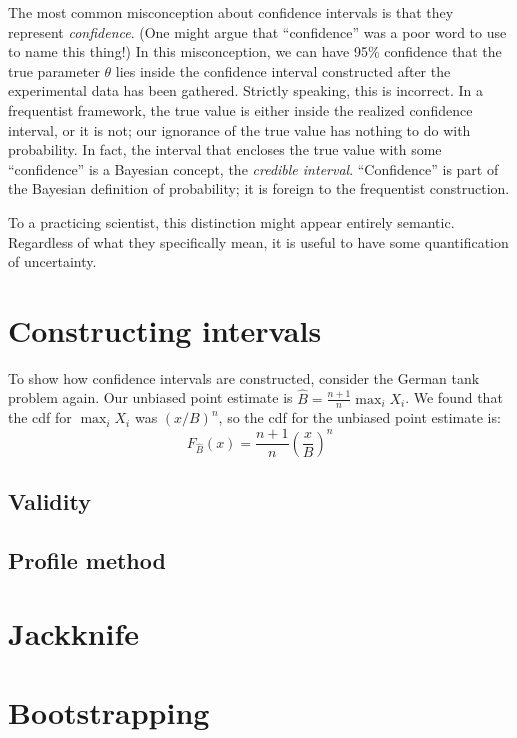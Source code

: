 The most common misconception about confidence intervals is that they represent
\emph{confidence}. (One might argue that ``confidence'' was a poor word to use to name this
thing!) In this misconception, we can have 95\% confidence that the true parameter $\theta$
lies inside the confidence interval constructed after the experimental data has been gathered.
Strictly speaking, this is incorrect. In a frequentist framework, the true
value is either inside the realized confidence interval, or it is not; our ignorance of
the true value has nothing to do with probability. In fact, the interval that encloses
the true value with some ``confidence'' is a Bayesian concept, the \emph{credible interval}.
``Confidence'' is part of the Bayesian definition of probability; it is foreign to the
frequentist construction.

To a practicing scientist, this distinction might appear entirely semantic. Regardless of
what they specifically mean, it is useful to have some quantification of uncertainty.

\section{Constructing intervals}

To show how confidence intervals are constructed, consider the German
tank problem again. Our unbiased point estimate is $\hat{B} = \tfrac{n+1}{n} \max_i X_i$.
We found that the cdf for $\max_i X_i$ was $(x/B)^n$, so the cdf for the
unbiased point estimate is:
\begin{equation*}
    F_{\hat{B}}(x) = \frac{n+1}{n} \left(\frac{x}{B}\right)^n
\end{equation*}

\subsection{Validity}

\subsection{Profile method}

\section{Jackknife}

\section{Bootstrapping}